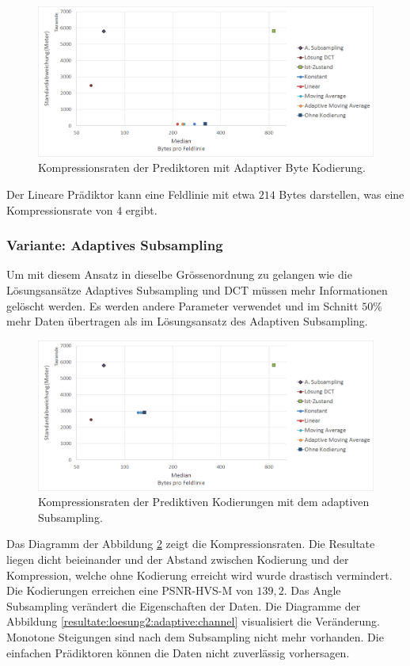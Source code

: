 \begin{figure}[!htbp]
	\center
	\includegraphics[width=1\textwidth,keepaspectratio]{./pictures/resultate/loesung2/variante0/resultate_byte.png}
	\caption{Kompressionsraten der Prediktoren mit Adaptiver Byte Kodierung.}
	\label{resultate:loesung2:simple:resultate_byte}
\end{figure}
Der Lineare Prädiktor kann eine Feldlinie mit etwa $214$ Bytes darstellen, was eine Kompressionsrate von $4$ ergibt.

\subsubsection{Variante: Adaptives Subsampling} \label{resultate:loesung2:adaptive}
Um mit diesem Ansatz in dieselbe Grössenordnung zu gelangen wie die Lösungsansätze Adaptives Subsampling und DCT müssen mehr Informationen gelöscht werden. Es werden andere Parameter verwendet und im Schnitt $50\%$ mehr Daten übertragen als im Lösungsansatz des Adaptiven Subsampling.

\begin{figure}[!htbp]
	\center
	\includegraphics[width=1\textwidth,keepaspectratio]{./pictures/resultate/loesung2/variante1/resultate_euler.png}
	\caption{Kompressionsraten der Prediktiven Kodierungen mit dem adaptiven Subsampling.}
	\label{resultate:loesung2:adaptive:euler}
\end{figure}
Das Diagramm der Abbildung \ref{resultate:loesung2:adaptive:euler} zeigt die Kompressionsraten. Die Resultate liegen dicht beieinander und der Abstand zwischen Kodierung und der Kompression, welche ohne Kodierung erreicht wird wurde drastisch vermindert. Die Kodierungen erreichen eine PSNR-HVS-M von $139,2$. Das Angle Subsampling verändert die Eigenschaften der Daten. Die Diagramme der Abbildung \ref{resultate:loesung2:adaptive:channel} visualisiert die Veränderung. Monotone Steigungen sind nach dem Subsampling nicht mehr vorhanden. Die einfachen Prädiktoren können die Daten nicht zuverlässig vorhersagen.

